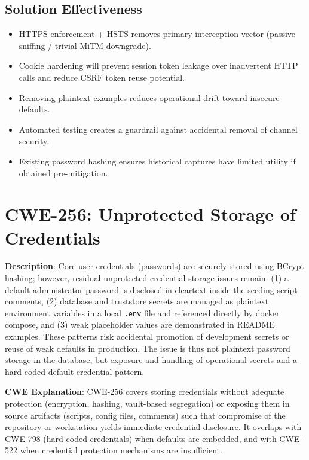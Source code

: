 \documentclass[]{UCD_CS_FYP_Report}
\begin{document}
\subsection*{Solution Effectiveness}
\begin{itemize}
	\item HTTPS enforcement + HSTS removes primary interception vector (passive sniffing / trivial MiTM downgrade).
	\item Cookie hardening will prevent session token leakage over inadvertent HTTP calls and reduce CSRF token reuse potential.
	\item Removing plaintext examples reduces operational drift toward insecure defaults.
	\item Automated testing creates a guardrail against accidental removal of channel security.
	\item Existing password hashing ensures historical captures have limited utility if obtained pre-mitigation.
\end{itemize}



\section{CWE-256: Unprotected Storage of Credentials}

	\textbf{Description}: Core user credentials (passwords) are securely stored using BCrypt hashing; however, residual unprotected credential storage issues remain: (1) a default administrator password is disclosed in cleartext inside the seeding script comments, (2) database and truststore secrets are managed as plaintext environment variables in a local \texttt{.env} file and referenced directly by docker compose, and (3) weak placeholder values are demonstrated in README examples. These patterns risk accidental promotion of development secrets or reuse of weak defaults in production. The issue is thus not plaintext password storage in the database, but exposure and handling of operational secrets and a hard-coded default credential pattern.

	\textbf{CWE Explanation}: CWE-256 covers storing credentials without adequate protection (encryption, hashing, vault-based segregation) or exposing them in source artifacts (scripts, config files, comments) such that compromise of the repository or workstation yields immediate credential disclosure. It overlaps with CWE-798 (hard-coded credentials) when defaults are embedded, and with CWE-522 when credential protection mechanisms are insufficient.
\end{document}
